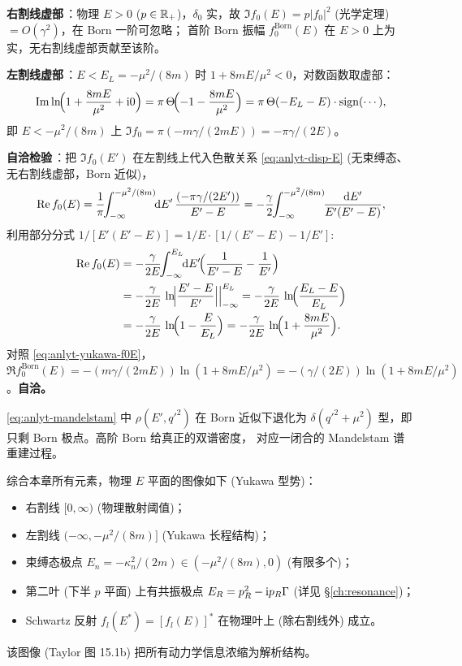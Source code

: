 \textbf{右割线虚部}\,：物理 $E>0$ ($p\in\mathbb{R}_+$)，$\delta_0$ 实，故
$\Im f_0(E)=p|f_0|^2$ (光学定理) $=O(\gamma^2)$，在 Born 一阶可忽略；
首阶 Born 振幅 $f_0^{\text{Born}}(E)$ 在 $E>0$ 上为实，无右割线虚部贡献至该阶。

\textbf{左割线虚部}\,：$E<E_L=-\mu^2/(8m)$ 时 $1+8mE/\mu^2<0$，对数函数取虚部：
\begin{equation}
\Im\ln\!\Bigl(1+\frac{8mE}{\mu^2}+\mathrm{i} 0\Bigr)=\pi\,\Theta\!\Bigl(-1-\frac{8mE}{\mu^2}\Bigr)
=\pi\,\Theta(-E_L-E)\cdot\text{sign}(\cdots),
\end{equation}
即 $E<-\mu^2/(8m)$ 上 $\Im f_0=\pi(-m\gamma/(2mE))=-\pi\gamma/(2E)$。

\textbf{自洽检验}\,：把 $\Im f_0(E')$ 在左割线上代入色散关系
\eqref{eq:anlyt-disp-E} (无束缚态、无右割线虚部，Born 近似)，
\begin{equation}
\Re f_0(E)=\frac{1}{\pi}\!\!\int_{-\infty}^{-\mu^2/(8m)}\!\!\rmd E'\,\frac{(-\pi\gamma/(2E'))}{E'-E}
=-\frac{\gamma}{2}\!\!\int_{-\infty}^{-\mu^2/(8m)}\!\!\frac{\rmd E'}{E'(E'-E)},
\label{eq:anlyt-yukawa-disp-check}
\end{equation}
利用部分分式
$1/[E'(E'-E)]=1/E\cdot[1/(E'-E)-1/E']$:
\begin{align}
\Re f_0(E) &=-\frac{\gamma}{2E}\!\!\int_{-\infty}^{E_L}\!\!\rmd E'\!\Bigl(\frac{1}{E'-E}-\frac{1}{E'}\Bigr)\notag\\
&=-\frac{\gamma}{2E}\,\ln\!\Bigl|\frac{E'-E}{E'}\Bigr|\Bigr|_{-\infty}^{E_L}
=-\frac{\gamma}{2E}\,\ln\!\Bigl(\frac{E_L-E}{E_L}\Bigr)\notag\\
&=-\frac{\gamma}{2E}\,\ln\!\Bigl(1-\frac{E}{E_L}\Bigr)
=-\frac{\gamma}{2E}\,\ln\!\Bigl(1+\frac{8mE}{\mu^2}\Bigr).
\label{eq:anlyt-yukawa-disp-result}
\end{align}
对照 \eqref{eq:anlyt-yukawa-f0E}，$\Re f_0^{\text{Born}}(E)=-(m\gamma/(2mE))\ln(1+8mE/\mu^2)
=-(\gamma/(2E))\ln(1+8mE/\mu^2)$。\textbf{自洽。}\checkmark

\begin{remark}
\eqref{eq:anlyt-mandelstam} 中 $\rho(E',q'^2)$ 在 Born 近似下退化为
$\delta(q'^2+\mu^2)$ 型，即只剩 Born 极点。高阶 Born 给真正的双谱密度，
对应一闭合的 Mandelstam 谱重建过程。
\end{remark}

\begin{remark}[$E$ 平面中物理叶图像]\label{rem:anlyt-Eplane}
综合本章所有元素，物理 $E$ 平面的图像如下 (Yukawa 型势)：
\begin{itemize}
\item 右割线 $[0,\infty)$ (物理散射阈值)；
\item 左割线 $(-\infty,-\mu^2/(8m)]$ (Yukawa 长程结构)；
\item 束缚态极点 $E_n=-\kappa_n^2/(2m)\in(-\mu^2/(8m),0)$ (有限多个)；
\item 第二叶 (下半 $p$ 平面) 上有共振极点 $E_R=p_R^2-\mathrm{i} p_R\Gamma$
(详见 \S\ref{ch:resonance})；
\item Schwartz 反射 $f_l(E^*)=[f_l(E)]^*$ 在物理叶上 (除右割线外) 成立。
\end{itemize}
该图像 (Taylor 图 15.1b) 把所有动力学信息浓缩为解析结构。
\end{remark}

